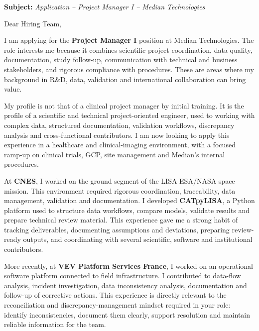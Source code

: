 \documentclass[11pt,a4paper]{altacv}
\begin{document}
\makecvheader
\vspace{-0.65cm}

\vspace{-0.45cm}

{\color{accent}\textbf{Subject:}} \textit{Application -- Project Manager I -- Median Technologies}

{\color{body}

Dear Hiring Team,

I am applying for the \textbf{Project Manager I} position at Median Technologies. The role interests me because it combines scientific project coordination, data quality, documentation, study follow-up, communication with technical and business stakeholders, and rigorous compliance with procedures. These are areas where my background in R\&D, data, validation and international collaboration can bring value.

My profile is not that of a clinical project manager by initial training. It is the profile of a scientific and technical project-oriented engineer, used to working with complex data, structured documentation, validation workflows, discrepancy analysis and cross-functional contributors. I am now looking to apply this experience in a healthcare and clinical-imaging environment, with a focused ramp-up on clinical trials, GCP, site management and Median's internal procedures.

At \textbf{CNES}, I worked on the ground segment of the LISA ESA/NASA space mission. This environment required rigorous coordination, traceability, data management, validation and documentation. I developed \textbf{CATpyLISA}, a Python platform used to structure data workflows, compare models, validate results and prepare technical review material. This experience gave me a strong habit of tracking deliverables, documenting assumptions and deviations, preparing review-ready outputs, and coordinating with several scientific, software and institutional contributors.

More recently, at \textbf{VEV Platform Services France}, I worked on an operational software platform connected to field infrastructure. I contributed to data-flow analysis, incident investigation, data inconsistency analysis, documentation and follow-up of corrective actions. This experience is directly relevant to the reconciliation and discrepancy-management mindset required in your role: identify inconsistencies, document them clearly, support resolution and maintain reliable information for the team.

}
\end{document}
